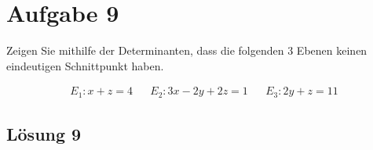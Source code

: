 \documentclass[main.tex]{subfiles}
\begin{document}
\section{Aufgabe 9}

Zeigen Sie mithilfe der Determinanten, dass die folgenden 3 Ebenen keinen eindeutigen Schnittpunkt haben.

\begin{align*}
    E_1: x+z=4 & & E_2: 3x-2y+2z = 1 & & E_3 : 2y+z=11
\end{align*}

\subsection{Lösung 9}
\end{document}
